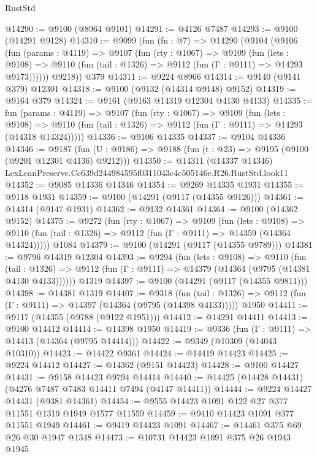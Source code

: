 \begin{lexlean}{RustStd}
\begin{coremodule}
@14290 := @9100 (@8964 @9101)
@14291 := @4126 @7487
@14293 := @9100 (@14291 @9128)
@14310 := @9099
    (fun (fn : @7) =>
    @14290
      (@9104
        (@9106
          (fun (params : @4119) =>
          @9107
            (fun (rty : @1067) =>
            @9109
              (fun (lets : @9108) =>
              @9110 (fun (tail : @1326) => @9112 (fun (Γ : @9111) => @14293 @9173))))))
        @9218))
    @379
@14311 := @9224 @8966
@14314 := @9140 (@9141 @379) @12301
@14318 := @9100 (@9132 (@14314 @9148) @9152)
@14319 := @9164 @379
@14324 := @9161 (@9163 @14319 @12304 @4130 @4133)
@14335 := fun (params : @4119) =>
  @9107
    (fun (rty : @1067) =>
    @9109
      (fun (lets : @9108) =>
      @9110 (fun (tail : @1326) => @9112 (fun (Γ : @9111) => @14293 (@14318 @14324)))))
@14336 := @9106 @14335
@14337 := @9104 @14336
@14346 := @9187
    (fun (U : @9186) => @9188 (fun (t : @23) => @9195 (@9100 (@9201 @12301 @4136) @9212)))
@14350 := @14311
    (@14337 @14346)
    LexLeanPreserve.Cc639d244984595f0311043c4c505146e.R26.RustStd.look11
@14352 := @9085 @14336 @14346
@14354 := @9269 @14335 @1931
@14355 := @9118 @1931
@14359 := @9100 (@14291 (@9117 (@14355 @9126)))
@14361 := @14314 (@9147 @1931)
@14362 := @9132 @14361
@14364 := @9100 (@14362 @9152)
@14375 := @9272
    (fun (rty : @1067) =>
    @9109
      (fun (lets : @9108) =>
      @9110 (fun (tail : @1326) => @9112 (fun (Γ : @9111) => @14359 (@14364 @14324)))))
    @1084
@14379 := @9100 (@14291 (@9117 (@14355 @9789)))
@14381 := @9796 @14319 @12304
@14393 := @9294
    (fun (lets : @9108) =>
    @9110
      (fun (tail : @1326) =>
      @9112 (fun (Γ : @9111) => @14379 (@14364 (@9795 (@14381 @4130 @4133))))))
    @1319
@14397 := @9100 (@14291 (@9117 (@14355 @9811)))
@14398 := @14381 @1319
@14407 := @9318
    (fun (tail : @1326) => @9112 (fun (Γ : @9111) => @14397 (@14364 (@9795 (@14398 @4133)))))
    @1950
@14411 := @9117 (@14355 (@9788 (@9122 @1951)))
@14412 := @14291 @14411
@14413 := @9100 @14412
@14414 := @14398 @1950
@14419 := @9336 (fun (Γ : @9111) => @14413 (@14364 (@9795 @14414)))
@14422 := @9349 (@10309 (@14043 @10310))
@14423 := @14422 @9361
@14424 := @14419 @14423
@14425 := @9224 @14412
@14427 := @14362 (@9151 @14423)
@14428 := @9100 @14427
@14431 := @9158 @14423 @9794 @14414
@14440 := @14425 (@14428 @14431) (@4276 @7487 @7483 @14411 @7494 (@4147 @14411))
@14444 := @9224 @14427 @14431 (@9381 @14361)
@14454 := @9555 @14423 @1091 @122 @27 @377 @11551 @1319 @1949 @1577 @11559
@14459 := @9410 @14423 @1091 @377 @11551 @1949
@14461 := @9419 @14423 @1091
@14467 := @14461 @375 @69 @26 @30 @1947 @1348
@14473 := @10731 @14423 @1091 @375 @26 @1943 @1945

\end{coremodule}
\end{lexlean}
